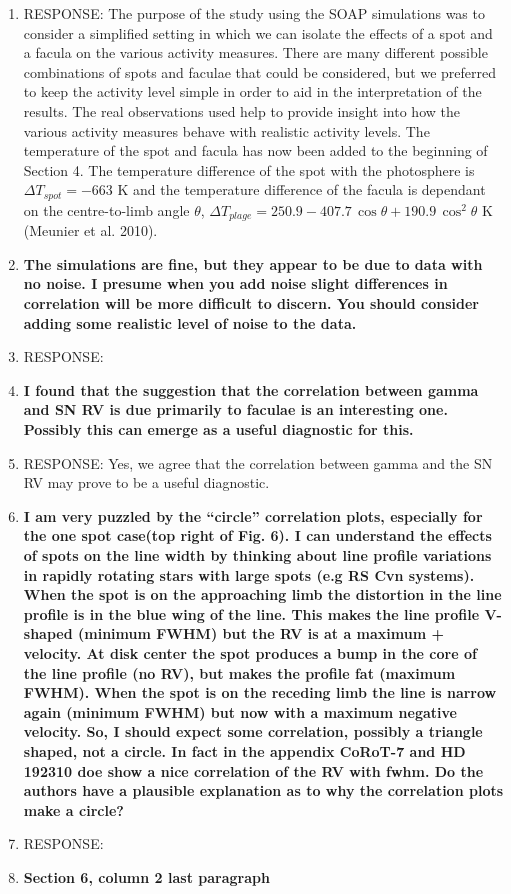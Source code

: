\documentclass[11pt]{article}   	%
\begin{document}
\begin{enumerate}
\item[]  RESPONSE:  The purpose of the study using the SOAP simulations was to consider a simplified setting in which we can isolate the effects of a spot and a facula on the various activity measures.  There are many different possible combinations of spots and faculae that could be considered, but we preferred to keep the activity level simple in order to aid in the interpretation of the results.  The real observations used help to provide insight into how the various activity measures behave with realistic activity levels.  The temperature of the spot and facula has now been added to the beginning of Section 4. The temperature difference of the spot with the photosphere is $\Delta T_{spot} = -663$ K and the temperature difference of the facula is dependant on the centre-to-limb angle $\theta$,  $\Delta T_{plage} = 250.9 - 407.7\,\cos{\theta} + 190.9\,\cos^2 \theta$ K (Meunier et al. 2010). 
\bigskip
%
%
\item {\bf The simulations are fine, but they appear to be due to data with no noise. I presume when you add noise slight differences in correlation will be more difficult to discern. You should consider adding some realistic level of noise to the data.}
%
\item[]  RESPONSE:  
\bigskip
%
%
\item {\bf I found that the suggestion that the correlation between gamma and SN RV is due primarily to faculae is an interesting one. Possibly this can emerge as a useful diagnostic for this.}
%
\item[]  RESPONSE:  Yes, we agree that the correlation between gamma and the SN RV may prove to be a useful diagnostic.
\bigskip
%
%
\item {\bf I am very puzzled by the ``circle'' correlation plots, especially for the one spot case(top right of Fig. 6). I can understand the effects of spots on the line width by thinking about line profile variations in rapidly rotating stars with large spots (e.g RS Cvn systems). When the spot is on the approaching limb the distortion in the line profile is in the blue wing of the line. This makes the line profile V-shaped (minimum FWHM) but the RV is at a maximum + velocity. At disk center the spot produces a bump in the core of the line profile (no RV), but makes the profile fat (maximum FWHM). When the spot is on the receding limb the line is narrow again (minimum FWHM) but now with a maximum negative velocity. So, I should expect some correlation, possibly a triangle shaped, not a circle. In fact in the appendix CoRoT-7 and HD 192310 doe show a nice correlation of the RV with fwhm. Do the authors have a plausible explanation as to why the correlation plots make a circle?}
%
\item[]  RESPONSE:  
\bigskip
%
%
\item {\bf Section 6, column 2 last paragraph\\

}
\end{enumerate}
\end{document}
